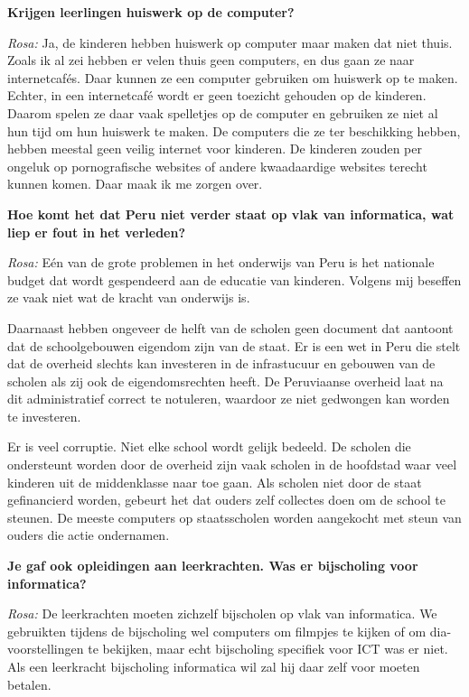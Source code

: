 \textbf{Krijgen leerlingen huiswerk op de computer?}

\textit{Rosa:} Ja, de kinderen hebben huiswerk op computer maar maken dat niet thuis. Zoals ik al zei hebben er velen thuis geen computers, en dus gaan ze naar internetcafés. Daar kunnen ze een computer gebruiken om huiswerk op te maken. Echter, in een internetcafé wordt er geen toezicht gehouden op de kinderen. Daarom spelen ze daar vaak spelletjes op de computer en gebruiken ze niet al hun tijd om hun huiswerk te maken. De computers die ze ter beschikking hebben, hebben meestal geen veilig internet voor kinderen. De kinderen zouden per ongeluk op pornografische websites of andere kwaadaardige websites terecht kunnen komen. Daar maak ik me zorgen over.

\textbf{Hoe komt het dat Peru niet verder staat op vlak van informatica, wat liep er fout in het verleden?}

\textit{Rosa:} Eén van de grote problemen in het onderwijs van Peru is het nationale budget dat wordt gespendeerd aan de educatie van kinderen. Volgens mij beseffen ze vaak niet wat de kracht van onderwijs is. 

Daarnaast hebben ongeveer de helft van de scholen geen document dat aantoont dat de schoolgebouwen eigendom zijn van de staat. Er is een wet in Peru die stelt dat de overheid slechts kan investeren in de infrastucuur en gebouwen van de scholen als zij ook de eigendomsrechten heeft. De Peruviaanse overheid laat na dit administratief correct te notuleren, waardoor ze niet gedwongen kan worden te investeren.

Er is veel corruptie. Niet elke school wordt gelijk bedeeld. De scholen die ondersteunt worden door de overheid zijn vaak scholen in de hoofdstad waar veel kinderen uit de middenklasse naar toe gaan. Als scholen niet door de staat gefinancierd worden, gebeurt het dat ouders zelf collectes doen om de school te steunen. De meeste computers op staatsscholen worden aangekocht met steun van ouders die actie ondernamen. 

\textbf{Je gaf ook opleidingen aan leerkrachten. Was er bijscholing voor informatica?}

\textit{Rosa:} De leerkrachten moeten zichzelf bijscholen op vlak van informatica. We gebruikten tijdens de bijscholing wel computers om filmpjes te kijken of om dia-voorstellingen te bekijken, maar echt bijscholing specifiek voor ICT was er niet. Als een leerkracht bijscholing informatica wil zal hij daar zelf voor moeten betalen.

